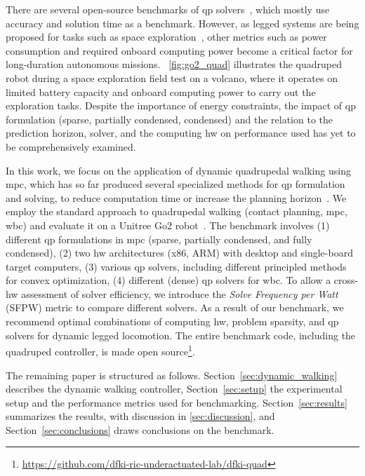 There are several open-source benchmarks of \acrshort{qp} solvers~\cite{caron_qpbenchmark_2024, attila_kozma_benchmarking_2015}, which mostly use accuracy and solution time as a benchmark. However, as legged systems are being proposed for tasks such as space exploration~\cite{spiridonov_spacehopper_2024, arm_spacebok_2019}, other metrics such as power consumption and required onboard computing power become a critical factor for long-duration autonomous missions. ~\autoref{fig:go2_quad} illustrates the quadruped robot during a space exploration field test on a volcano, where it operates on limited battery capacity and onboard computing power to carry out the exploration tasks. Despite the importance of energy constraints, the impact of \gls{qp} formulation (sparse, partially condensed, condensed) and the relation to the prediction horizon, solver, and the computing \gls{hw} on performance used has yet to be comprehensively examined.

In this work, we focus on the application of dynamic quadrupedal walking using \gls{mpc}, which has so far produced several specialized methods for \gls{qp} formulation and solving, to reduce computation time or increase the planning horizon~\cite{ding_real-time_2019,di_carlo_dynamic_2018,kim_highly_2019}. 
We employ the standard approach to quadrupedal walking (contact planning, \gls{mpc}, \gls{wbc}) and evaluate it on a Unitree Go2 robot~\cite{unitree_robotics_unitree_nodate}. 
The benchmark involves (1) different \gls{qp} formulations in \gls{mpc} (sparse, partially condensed, and fully condensed), (2) two \gls{hw} architectures (x86, ARM) with desktop and single-board target computers, (3) various \gls{qp} solvers, including different principled methods for convex optimization, (4) different (dense) \gls{qp} solvers for \gls{wbc}. To allow a cross-\gls{hw} assessment of solver efficiency, we introduce the \textit{Solve Frequency per Watt} (SFPW) metric to compare different solvers. As a result of our benchmark, we recommend optimal combinations of computing \gls{hw}, problem sparsity, and \gls{qp} solvers for dynamic legged locomotion. The entire benchmark code, including the quadruped controller, is made open source\footnote{\url{https://github.com/dfki-ric-underactuated-lab/dfki-quad}}.

The remaining paper is structured as follows. Section~\ref{sec:dynamic_walking} describes the dynamic walking controller,  Section~\ref{sec:setup} the experimental setup and the performance metrics used for benchmarking. Section~\ref{sec:results} summarizes the results, with discussion in \autoref{sec:discussion}, and Section~\ref{sec:conclusions} draws conclusions on the benchmark.

